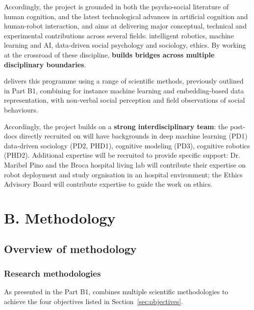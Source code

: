 Accordingly, the project is grounded in both the psycho-social literature of
human cognition, and the latest technological advances in artificial cognition
and human-robot interaction, and aims at delivering major conceptual, technical
and experimental contributions across several fields: intelligent robotics,
machine learning and AI, data-driven social psychology and sociology, ethics. By
working at the crossroad of these discipline, \textbf{\project builds bridges
across multiple disciplinary boundaries}.

\project delivers this programme using a range of scientific methods,
previously outlined in Part B1, combining for instance machine learning and
embedding-based data representation, with non-verbal social perception and field
observations of social behaviours.

Accordingly, the project builds on a \textbf{strong interdisciplinary team}: the
post-docs directly recruited on \project will have backgrounds in deep machine
learning (PD1) data-driven sociology (PD2, PHD1), cognitive modeling (PD3),
cognitive robotics (PHD2). Additional expertise will be recruited to provide
specific support: Dr. Maribel Pino and the Broca hospital living lab will
contribute their expertise on robot deployment and study orgnisation in an
hospital environment; the \project Ethics Advisory Board will contribute
expertise to guide the work on ethics.

\section{B. Methodology}

\subsection{Overview of \project methodology}

\subsubsection{Research methodologies}

As presented in the Part B1, \project combines multiple scientific
methodologies to achieve the four objectives listed in
Section~\ref{sec:objectives}.



